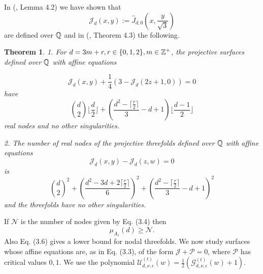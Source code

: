 \documentclass{birkjour_t2}
\newtheorem{thm}{Theorem}[section]
\theoremstyle{definition}
\theoremstyle{remark}
\numberwithin{equation}{section}
\begin{document}
  \par
  In (\cite{esc18}, Lemma 4.2) we have shown that
     \begin{equation} 
      {\mathcal{J}}_{d}(x, y):= \hat{J}_{d, 0}\left(x, \frac{y}{ \sqrt{3}}\right)
           \end{equation}      
are defined over ${\Bbb{Q}}$ and in (\cite{esc18}, Theorem 4.3) the following. 

\begin{thm}
 \par
1. For $d=3m+r, r \in\{0,1,2\}, m \in {\Bbb{Z}}^{+}$, the projective surfaces defined over ${\Bbb{Q}}$ with affine equations 

     \begin{equation} 
      {\mathcal{J}}_{d}(x, y)+\frac{1}{4}(3-{\mathcal{J}}_{d}(2z+1, 0))=0 
       \end{equation}     
         have 
            \begin{equation}  
        {d \choose 2} \Big  \lfloor \frac{d}{2} \Big  \rfloor+\left(\frac{d^{2}-\lceil\frac{r}{2}\rceil}{3}-d+1\right) \Big \lfloor \frac{d-1}{2} \Big \rfloor
       \end{equation}         
        real nodes and no other singularities. 
        \par
2. The number of real nodes of the projective threefolds defined over ${\Bbb{Q}}$ with affine equations 
   \begin{equation} 
   {\mathcal{J}}_{d}(x, y)-{\mathcal{J}}_{d}(z, w)=0
          \end{equation}     
    is
            \begin{equation}  
{d \choose 2}^2+\left(\frac{d^{2}-3d+2\lceil\frac{r}{2}\rceil}{6}\right)^2+\left(\frac{d^{2}-\lceil\frac{r}{2}\rceil}{3}-d+1\right)^2
       \end{equation}   
and the threefolds have no other singularities.
\end{thm}        
 \bigskip\par
If $\mathcal{N}$ is the number of nodes given by Eq. (3.4)  then 
            \begin{equation} 
\mu_{A_{1}}(d) \geq \mathcal{N}. 
      \end{equation}   
Also Eq. (3.6) gives a lower bound for nodal threefolds. We now study surfaces whose affine equations are, as in Eq. (3.3), of the form ${\mathcal{J}}+{\mathcal{P}}=0$, where ${\mathcal{P}}$ has critical values $0,1$. We use the polynomial ${\mathcal{U}}^{(t)}_{d,\nu,\epsilon}(w)=\frac{1}{2}({\mathcal{G}}^{(t)}_{d,\nu,\epsilon}(w)+1)$.
\end{document}
